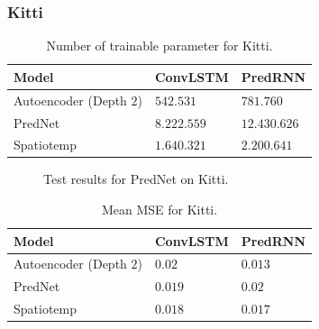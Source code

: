   \subsubsection{Kitti}
   \begin{table}[H]
    \begin{center}
     \begin{tabular}{| l | l | l |}\hline
      \textbf{Model} & \textbf{ConvLSTM} & \textbf{PredRNN} \\\hline
      Autoencoder (Depth $2$) & $542.531$ & $781.760$ \\\hline
      PredNet & $8.222.559$ & $12.430.626$ \\\hline
      Spatiotemp & $1.640.321$ & $2.200.641$ \\\hline
     \end{tabular}
    \end{center}
    \caption{Number of trainable parameter for Kitti.}
   \end{table}\noindent
   \begin{figure}[H]
   \centering
   \qquad
   \qquad
   \caption{Test results for PredNet on Kitti.}
   \label{figure::prednet_kth_results}
  \end{figure}\noindent
   \begin{table}[H]
    \begin{center}
     \begin{tabular}{| l | l | l |}\hline
      \textbf{Model} & \textbf{ConvLSTM} & \textbf{PredRNN} \\\hline
      Autoencoder (Depth $2$) & $0.02$ & $0.013$ \\\hline
      PredNet & $0.019$ & $0.02$ \\\hline
      Spatiotemp & $0.018$ & $0.017$ \\\hline
     \end{tabular}
    \end{center}
    \caption{Mean MSE for Kitti.}
   \end{table}